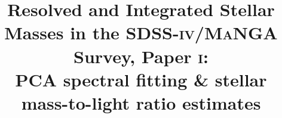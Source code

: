 \documentclass[twocolumn, tighten]{aastex62}
\begin{document}
\title{Resolved and Integrated Stellar Masses in the SDSS-\textsc{iv}/\textsc{MaNGA} Survey, Paper \textsc{i}: \\ PCA spectral fitting \& stellar mass-to-light ratio estimates}


\end{document}
